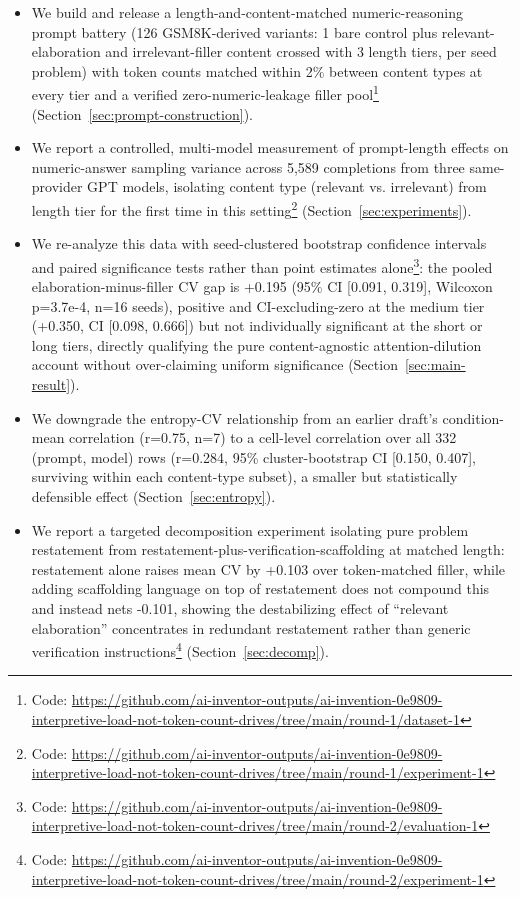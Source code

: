 \documentclass[11pt,letterpaper]{article}
\begin{document}
\begin{itemize}
  \item We build and release a length-and-content-matched numeric-reasoning prompt battery (126 GSM8K-derived variants: 1 bare control plus relevant-elaboration and irrelevant-filler content crossed with 3 length tiers, per seed problem) with token counts matched within 2\% between content types at every tier and a verified zero-numeric-leakage filler pool\footnote{Code: \url{https://github.com/ai-inventor-outputs/ai-invention-0e9809-interpretive-load-not-token-count-drives/tree/main/round-1/dataset-1}} (Section~\ref{sec:prompt-construction}).
  \item We report a controlled, multi-model measurement of prompt-length effects on numeric-answer sampling variance across 5,589 completions from three same-provider GPT models, isolating content type (relevant vs. irrelevant) from length tier for the first time in this setting\footnote{Code: \url{https://github.com/ai-inventor-outputs/ai-invention-0e9809-interpretive-load-not-token-count-drives/tree/main/round-1/experiment-1}} (Section~\ref{sec:experiments}).
  \item We re-analyze this data with seed-clustered bootstrap confidence intervals and paired significance tests rather than point estimates alone\footnote{Code: \url{https://github.com/ai-inventor-outputs/ai-invention-0e9809-interpretive-load-not-token-count-drives/tree/main/round-2/evaluation-1}}: the pooled elaboration-minus-filler CV gap is +0.195 (95\% CI [0.091, 0.319], Wilcoxon p=3.7e-4, n=16 seeds), positive and CI-excluding-zero at the medium tier (+0.350, CI [0.098, 0.666]) but not individually significant at the short or long tiers, directly qualifying the pure content-agnostic attention-dilution account without over-claiming uniform significance (Section~\ref{sec:main-result}).
  \item We downgrade the entropy-CV relationship from an earlier draft's condition-mean correlation (r=0.75, n=7) to a cell-level correlation over all 332 (prompt, model) rows (r=0.284, 95\% cluster-bootstrap CI [0.150, 0.407], surviving within each content-type subset), a smaller but statistically defensible effect (Section~\ref{sec:entropy}).
  \item We report a targeted decomposition experiment isolating pure problem restatement from restatement-plus-verification-scaffolding at matched length: restatement alone raises mean CV by +0.103 over token-matched filler, while adding scaffolding language on top of restatement does not compound this and instead nets -0.101, showing the destabilizing effect of ``relevant elaboration'' concentrates in redundant restatement rather than generic verification instructions\footnote{Code: \url{https://github.com/ai-inventor-outputs/ai-invention-0e9809-interpretive-load-not-token-count-drives/tree/main/round-2/experiment-1}} (Section~\ref{sec:decomp}).
\end{itemize}
\end{document}
